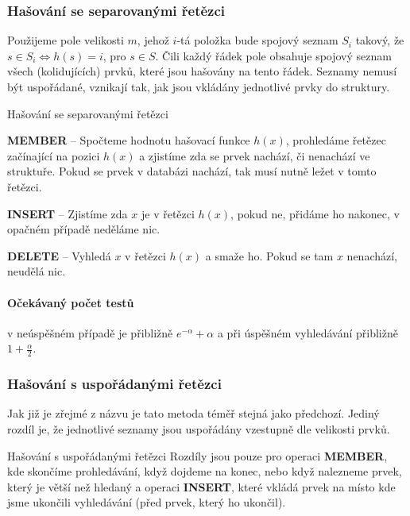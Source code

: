 \subsubsection*{Hašování se separovanými řetězci}

Použijeme pole velikosti $m$, jehož $i$-tá položka bude spojový seznam $S_i$
takový, že $s\in S_i \Leftrightarrow h(s)=i$, pro $s\in S$. Čili každý řádek
pole obsahuje spojový seznam všech (kolidujících) prvků, které jsou hašovány na
tento řádek. Seznamy nemusí být uspořádané, vznikají tak, jak jsou vkládány
jednotlivé prvky do struktury.

\begin{algoritmusN}{Hašování se separovanými řetězci}
\begin{pitemize}
\item \textbf{MEMBER} -- Spočteme hodnotu hašovací funkce $h(x)$, prohledáme
řetězec začínající na pozici $h(x)$ a zjistíme zda se prvek nachází, či
nenachází ve struktuře. Pokud se prvek v databázi nachází, tak musí nutně ležet
v tomto řetězci.
\item \textbf{INSERT} -- Zjistíme zda $x$ je v řetězci $h(x)$, pokud ne, přidáme
ho nakonec, v opačném případě neděláme nic.
\item \textbf{DELETE} -- Vyhledá $x$ v řetězci $h(x)$ a smaže ho. Pokud se tam
$x$ nenachází, neudělá nic.
\end{pitemize}
\end{algoritmusN}

\paragraph{Očekávaný počet testů} v neúspěšném případě je přibližně
$e^{-\alpha} + \alpha$ a při úspěšném vyhledávání přibližně
$1+\frac{\alpha}{2}$.

\subsubsection*{Hašování s uspořádanými řetězci}

Jak již je zřejmé z názvu je tato metoda téměř stejná jako předchozí. Jediný
rozdíl je, že jednotlivé seznamy jsou uspořádány vzestupně dle velikosti
prvků.

\begin{algoritmusN}{Hašování s uspořádanými řetězci}
Rozdíly jsou pouze pro operaci \textbf{MEMBER}, kde skončíme prohledávání, když
dojdeme na konec, nebo když nalezneme prvek, který je větší než hledaný a
operaci \textbf{INSERT}, které vkládá prvek na místo kde jsme ukončili
vyhledávání (před prvek, který ho ukončil).
\end{algoritmusN}

